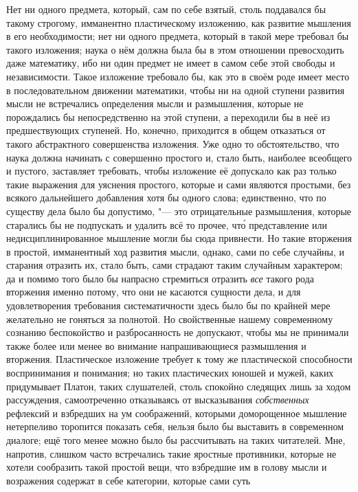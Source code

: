 Нет ни одного предмета, который, сам по себе взятый, столь поддавался бы такому
строгому, имманентно пластическому изложению, как развитие мышления в его
необходимости; нет ни одного предмета, который в такой мере требовал бы такого
изложения; наука о нём должна была бы в этом отношении превосходить даже
математику, ибо ни один предмет не имеет в самом себе этой свободы и
независимости. Такое изложение требовало бы, как это в своём роде имеет место в
последовательном движении математики, чтобы ни на одной ступени развития мысли
не встречались определения мысли и размышления, которые не порождались бы
непосредственно на этой ступени, а переходили бы в неё из предшествующих
ступеней. Но, конечно, приходится в общем отказаться от такого абстрактного
совершенства изложения. Уже одно то обстоятельство, что наука должна начинать с
совершенно простого и, стало быть, наиболее всеобщего и пустого, заставляет
требовать, чтобы изложение её допускало как раз только такие выражения для
уяснения простого, которые и сами являются простыми, без всякого дальнейшего
добавления хотя бы одного слова; единственно, что по существу дела было бы
допустимо, "--- это отрицательные размышления, которые старались бы не
подпускать и удалить всё то прочее, чт\'{о} представление или
недисциплинированное мышление могли бы сюда привнести. Но такие вторжения в
простой, имманентный ход развития мысли, однако, сами по себе случайны, и
старания отразить их, стало быть, сами страдают таким случайным характером; да
и помимо того было бы напрасно стремиться отразить {\em все} такого рода вторжения
именно потому, что они не касаются сущности дела, и для удовлетворения
требования систематичности здесь было бы по крайней мере желательно не гоняться
за полнотой. Но свойственные нашему современному сознанию беспокойство и
разбросанность не допускают, чтобы мы не принимали также более или менее во
внимание напрашивающиеся размышления и вторжения. Пластическое изложение
требует к тому же пластической способности воспринимания и понимания; но таких
пластических юношей и мужей, каких придумывает Платон, таких слушателей, столь
спокойно следящих лишь за ходом рассуждения, самоотреченно отказываясь от
высказывания {\em собственных} рефлексий и взбредших на ум соображений,
которыми доморощенное мышление нетерпеливо торопится показать себя, нельзя было
бы выставить в современном диалоге; ещё того менее можно было бы рассчитывать
на таких читателей. Мне, напротив, слишком часто встречались такие яростные
противники, которые не хотели сообразить такой простой вещи, что взбредшие им в
голову мысли и возражения содержат в себе категории, которые сами суть

